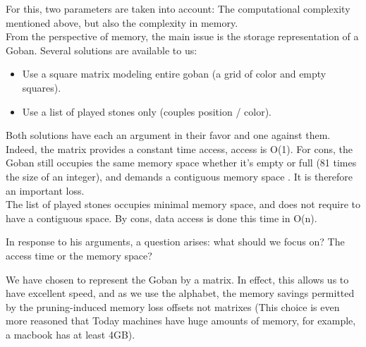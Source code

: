 \documentclass[11pt,a4paper]{report}
\begin{document}
For this, two parameters are taken into account: The computational complexity mentioned above, but also the complexity in memory. \\

From the perspective of memory, the main issue is the storage representation of a Goban. Several solutions are available to us: \\
     
 \begin{itemize}
\item    Use a square matrix modeling entire goban (a grid of color and empty squares). 
\item    Use a list of played stones only (couples position / color). 
\end{itemize}
\bigskip

Both solutions have each an argument in their favor and one against them. \\

Indeed, the matrix provides a constant time access, access is O(1). For cons, the Goban still occupies the same memory space whether it's empty or full (81 times the size of an integer), and demands a contiguous memory space . It is therefore an important loss. \\

The list of played stones occupies minimal memory space, and does not require to have a contiguous space. By cons, data access is done this time  in O(n). 
\bigskip



In response to his arguments, a question arises: what should we focus on? The access time or the memory space? 

We have chosen to represent the Goban by a matrix. In effect, this allows us to have excellent speed, and as we use the alphabet, the memory savings permitted by the pruning-induced memory loss offsets not matrixes (This choice is even more reasoned that Today machines have huge amounts of memory, for example, a macbook has at least 4GB).
\end{document}
